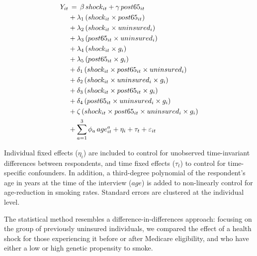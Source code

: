 \documentclass[11pt]{article}
\begin{document}
\begin{align} \label{eq:regression}
Y_{it}& \thinspace  = \thinspace
				\beta \thinspace shock_{it} + \gamma \thinspace post65_{it} \\
				&+\lambda_1 \thinspace  (shock_{it} \times post65_{it}) \nonumber \\
				&+ \lambda_2 \thinspace (shock_{it} \times uninsured_i) \nonumber \\
				&+\lambda_3  \thinspace (post65_{it} \times uninsured_i) \nonumber \\
				&+ \lambda_4 \thinspace (shock_{it} \times g_i) \nonumber \\
				&+\lambda_5 \thinspace (post65_{it} \times g_i) \nonumber \\
				&+ \delta_1 \thinspace (shock_{it} \times post65_{it} \times uninsured_i) \nonumber \\
				&+ \delta_2 \thinspace (shock_{it} \times uninsured_i \times g_i) \nonumber \\
				&+ \delta_3 \thinspace (shock_{it} \times post65_{it} \times g_i) \nonumber \\
				&+ \delta_4 \thinspace (post65_{it} \times uninsured_i \times g_i) \nonumber\\
				&+ \zeta \thinspace (shock_{it} \times post65_{it} \times uninsured_i \times g_i) \nonumber \\
				&+ \sum_{a=1}^3 \phi_a \thinspace age_{it}^{a} + \eta_i + \tau_t + \varepsilon_{it} \nonumber
\end{align}

Individual fixed effects ($\eta_i$) are included to control for unobserved time-invariant differences between respondents, and time fixed effects ($\tau_t$) to control for time-specific confounders.
In addition, a third-degree polynomial of the respondent's age in years at the time of the interview ($age$) is added to non-linearly control for age-reduction in smoking rates.
Standard errors are clustered at the individual level.

The statistical method resembles a difference-in-differences approach: focusing on the group of previously uninsured individuals, we compared the effect of a health shock for those experiencing it before or after Medicare eligibility, and who have either a low or high genetic propensity to smoke.
%
\end{document}
